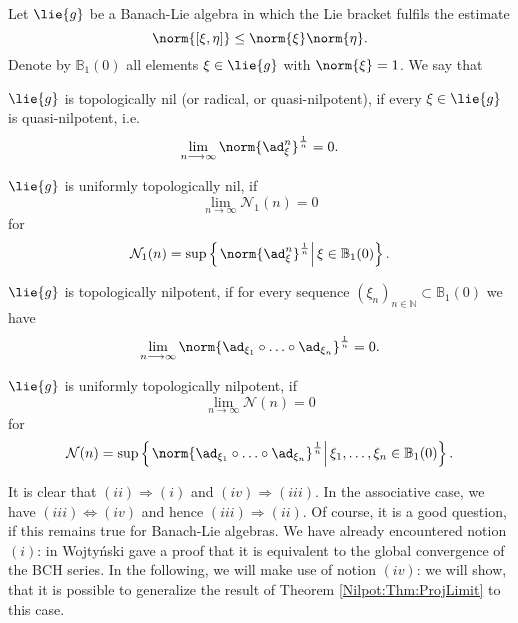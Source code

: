 \begin{definition}
	Let $\lie{g}$ be a Banach-Lie algebra in which the Lie bracket fulfils the 
	estimate
	\begin{equation*}
		\norm{ [\xi, \eta] }
		\leq
		\norm{\xi}
		\norm{\eta}.
	\end{equation*}
	Denote by $\mathbb{B}_1(0)$ all elements $\xi \in \lie{g}$ with 
	$\norm{\xi} = 1$. We say that
	\begin{definitionlist}
		\item
		$\lie{g}$ is topologically nil (or radical, or quasi-nilpotent), if
		every $\xi \in \lie{g}$ is quasi-nilpotent, i.e.
		\begin{equation*}
			\lim_{n \longrightarrow \infty}
			\norm{\ad_{\xi}^n}^{\frac{1}{n}}
			=
			0.
		\end{equation*}
		
		\item
		$\lie{g}$ is uniformly topologically nil, if
		\begin{equation*}
			\lim_{n \longrightarrow \infty}
			\mathcal{N}_1(n)
			=
			0
		\end{equation*}
		for
		\begin{equation}
			\mathcal{N}_1(n)
			=
			\sup \left\{ 
			\left.
				\norm{ \ad_{\xi}^n}^{\frac{1}{n}} 
			\right|
				\xi \in \mathbb{B}_1(0)
			\right\}.
		\end{equation}
		
		\item
		$\lie{g}$ is topologically nilpotent, if for every sequence
		$(\xi_n)_{n \in \mathbb{N}} \subset \mathbb{B}_1(0)$ we have
		\begin{equation*}
			\lim_{n \longrightarrow \infty}
			\norm{ 
				\ad_{\xi_1} \circ \ldots \circ \ad_{\xi_n}
			}^{\frac{1}{n}}
			=
			0.
		\end{equation*}
		
		\item
		$\lie{g}$ is uniformly topologically nilpotent, if
		\begin{equation*}
			\lim_{n \longrightarrow \infty}
			\mathcal{N}(n)
			=
			0
		\end{equation*}
		for
		\begin{equation}
			\mathcal{N}(n)
			=
			\sup \left\{ 
			\left.
				\norm{ 
					\ad_{\xi_1} \circ \ldots \circ \ad_{\xi_n}
				}^{\frac{1}{n}} 
			\right|
				\xi_1, \ldots, \xi_n \in \mathbb{B}_1(0)
			\right\}.
		\end{equation}
	\end{definitionlist}
\end{definition}
It is clear that $(ii) \Rightarrow (i)$ and $(iv) \Rightarrow (iii)$. In the 
associative case, we have $(iii) \Leftrightarrow (iv)$ and hence $(iii) 
\Rightarrow (ii)$. Of course, it is a good question, if this remains true for 
Banach-Lie algebras. We have already encountered notion $(i)$: in 
\cite{wojtynski:1998a} Wojty\'nski gave a proof that it is equivalent to the 
global convergence of the BCH series. In the following, we will make use of notion 
$(iv)$: we will show, that it is possible to generalize the result of Theorem 
\ref{Nilpot:Thm:ProjLimit} to this case.



